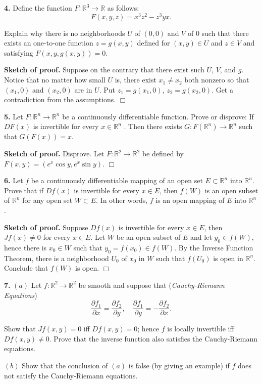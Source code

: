 \documentclass{article}
\begin{document}
    \textbf{4.} Define the function $F : \mathbb{R}^3 \to \mathbb{R}$ as
follows: \[F (x, y, z) = x^3 z^2 − z^3 yx.\]

Explain why there is no neighborhoods $U$ of $(0, 0)$ and $V$ of $0$
such that there exists an one-to-one function $z = g(x, y)$ defined for
$(x, y) \in U$ and $z \in V$ and satisfying $F (x, y, g(x, y)) = 0$.

    \textbf{Sketch of proof.} Suppose on the contrary that there exist such
$U$, $V$, and $g$. Notice that no matter how small $U$ is, there exist
$x_1\neq x_2$ both nonzero so that $(x_1, 0)$ and $(x_2, 0)$ are in $U$.
Put $z_1 = g(x_1, 0)$, $z_2 = g(x_2, 0)$. Get a contradiction from the
assumptions. $\Box$

    \textbf{5.} Let $F : \mathbb{R}^n \to \mathbb{R}^n$ be a continuously
differentiable function. Prove or disprove: If $DF (x)$ is invertible
for every $x \in \mathbb{R}^n$ . Then there exists
$G : F (\mathbb{R}^n ) \to \mathbb{R}^n$ such that $G (F(x)) = x$.

    \textbf{Sketch of proof.} Disprove. Let
$F: \mathbb{R}^2 \to \mathbb{R}^2$ be defined by
$F(x,y) = (e^x\cos y, e^x \sin y)$. $\Box$

    \textbf{6.} Let $f$ be a continuously differentiable mapping of an open
set $E \subset \mathbb{R}^n$ into $\mathbb{R}^n$. Prove that if $Df (x)$
is invertible for every $x\in E$, then $f (W )$ is an open subset of
$\mathbb{R}^n$ for any open set $W \subset E$. In other words, $f$ is an
open mapping of $E$ into $\mathbb{R}^n$.

    \textbf{Sketch of proof.} Suppose $Df(x)$ is invertible for every
$x\in E$, then $Jf(x) \ne 0$ for every $x\in E$. Let $W$ be an open
subset of $E$ and let $y_0 \in f(W)$, hence there is $x_0 \in W$ such
that $y_0 = f(x_0) \in f(W)$. By the Inverse Function Theorem, there is
a neighborhood $U_0$ of $x_0$ in $W$ such that $f(U_0)$ is open in
$\mathbb{R}^n$. Conclude that $f(W)$ is open. $\Box$

    \textbf{7.} $(a)$ Let $f : \mathbb{R}^2 \to \mathbb{R}^2$ be smooth and
suppose that (\emph{Cauchy-Riemann Equations})
\[ \frac{\partial f_1}{\partial x} =  \frac{\partial f_2}{\partial y},\quad  \frac{\partial f_1}{\partial y}=- \frac{\partial f_2}{\partial x}.\]

Show that $Jf (x, y) = 0$ iff $Df (x, y) = 0$; hence $f$ is locally
invertible iff $Df (x, y) \neq 0$. Prove that the inverse function also
satisfies the Cauchy-Riemann equations.

$(b)$ Show that the conclusion of $(a)$ is false (by giving an example)
if $f$ does not satisfy the Cauchy-Riemann equations.
\end{document}
